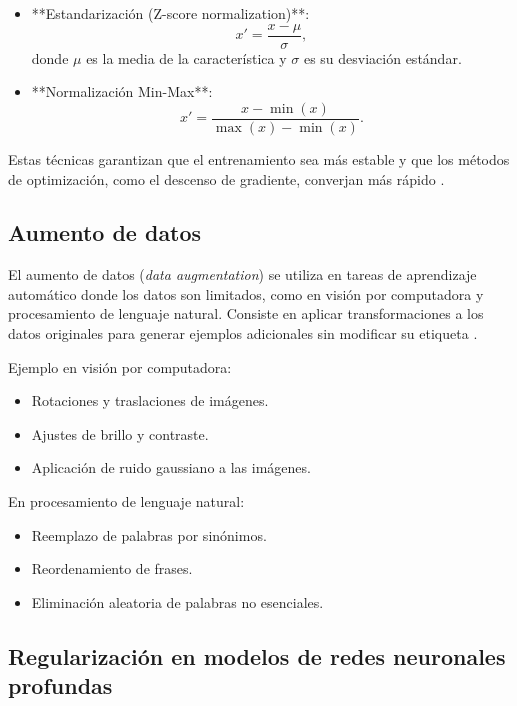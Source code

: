 \begin{itemize}
		\begin{itemize}
			\item **Estandarización (Z-score normalization)**:
			\begin{equation}
				x' = \frac{x - \mu}{\sigma},
			\end{equation}
			donde \(\mu\) es la media de la característica y \(\sigma\) es su desviación estándar.
			\item **Normalización Min-Max**:
			\begin{equation}
				x' = \frac{x - \min(x)}{\max(x) - \min(x)}.
			\end{equation}
		\end{itemize}
		
		Estas técnicas garantizan que el entrenamiento sea más estable y que los métodos de optimización, como el descenso de gradiente, converjan más rápido \cite{lecun2012efficient}.
		
		\subsection{Aumento de datos}
		
		El aumento de datos (\textit{data augmentation}) se utiliza en tareas de aprendizaje automático donde los datos son limitados, como en visión por computadora y procesamiento de lenguaje natural. Consiste en aplicar transformaciones a los datos originales para generar ejemplos adicionales sin modificar su etiqueta \cite{shorten2019survey}.
		
		Ejemplo en visión por computadora:
		\begin{itemize}
			\item Rotaciones y traslaciones de imágenes.
			\item Ajustes de brillo y contraste.
			\item Aplicación de ruido gaussiano a las imágenes.
		\end{itemize}
		
		En procesamiento de lenguaje natural:
		\begin{itemize}
			\item Reemplazo de palabras por sinónimos.
			\item Reordenamiento de frases.
			\item Eliminación aleatoria de palabras no esenciales.
		\end{itemize}
		
		\subsection{Regularización en modelos de redes neuronales profundas}
		

\end{itemize}
